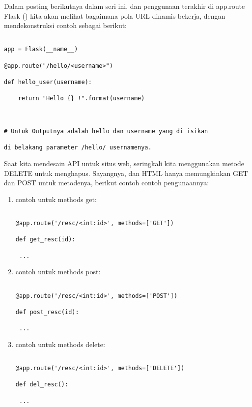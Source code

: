 Dalam posting berikutnya dalam seri ini, dan penggunaan terakhir di app.route Flask () kita akan melihat bagaimana pola URL dinamis bekerja, dengan mendekonstruksi contoh sebagai berikut:



\begin{verbatim}

app = Flask(__name__)

@app.route("/hello/<username>")

def hello_user(username):

    return "Hello {} !".format(username)

    

# Untuk Outputnya adalah hello dan username yang di isikan 

di belakang parameter /hello/ usernamenya.

\end{verbatim}



Saat kita mendesain API untuk situs web, seringkali kita menggunakan metode DELETE untuk menghapus. Sayangnya, dan HTML hanya memungkinkan GET dan POST untuk metodenya, berikut contoh contoh pengunaannya:



\begin{enumerate}

\item contoh untuk methods get:

\begin{verbatim} 

@app.route('/resc/<int:id>', methods=['GET'])

def get_resc(id):

 ...

\end{verbatim}



\item contoh untuk methods post:

\begin{verbatim} 

@app.route('/resc/<int:id>', methods=['POST'])

def post_resc(id):

 ...

\end{verbatim}



\item contoh untuk methods delete:

\begin{verbatim} 

@app.route('/resc/<int:id>', methods=['DELETE'])

def del_resc():

 ...

\end{verbatim}

\end{enumerate}

